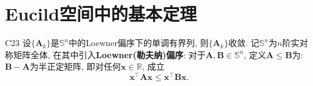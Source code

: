 \section{Eucild空间中的基本定理}
\begin{theorem}{}{C23}
    设\(\{\boldsymbol{A}_k\}\)是\(\mathbb{S}^n\)中的Loewner偏序下的单调有界列, 则\(\{\boldsymbol{A}_k\}\)收敛.
    \tcbline*
    记\(\mathbb{S}^n\)为\(n\)阶实对称矩阵全体, 在其中引入\textbf{Loewner(勒夫纳)偏序}: 对于\(\boldsymbol{A,B}\in\mathbb{S}^n\), 定义\(\boldsymbol{A}\leqslant\boldsymbol{B}\)为: \(\boldsymbol{B-A}\)为半正定矩阵, 即对任何\(\boldsymbol{x}\in \mathbb{R}\), 成立\[\boldsymbol{x}^\top\boldsymbol{Ax}\leqslant\boldsymbol{x}^\top\boldsymbol{Bx}.\]
\end{theorem}
